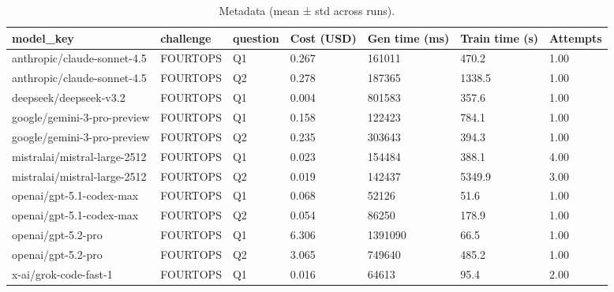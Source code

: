 \begin{table}
\caption{Metadata (mean ± std across runs).}
\label{tab:benchmark_metadata}
\begin{tabular}{lllllll}
\toprule
model\_key & challenge & question & Cost (USD) & Gen time (ms) & Train time (s) & Attempts \\
\midrule
anthropic/claude-sonnet-4.5 & FOURTOPS & Q1 & 0.267 & 161011 & 470.2 & 1.00 \\
anthropic/claude-sonnet-4.5 & FOURTOPS & Q2 & 0.278 & 187365 & 1338.5 & 1.00 \\
deepseek/deepseek-v3.2 & FOURTOPS & Q1 & 0.004 & 801583 & 357.6 & 1.00 \\
google/gemini-3-pro-preview & FOURTOPS & Q1 & 0.158 & 122423 & 784.1 & 1.00 \\
google/gemini-3-pro-preview & FOURTOPS & Q2 & 0.235 & 303643 & 394.3 & 1.00 \\
mistralai/mistral-large-2512 & FOURTOPS & Q1 & 0.023 & 154484 & 388.1 & 4.00 \\
mistralai/mistral-large-2512 & FOURTOPS & Q2 & 0.019 & 142437 & 5349.9 & 3.00 \\
openai/gpt-5.1-codex-max & FOURTOPS & Q1 & 0.068 & 52126 & 51.6 & 1.00 \\
openai/gpt-5.1-codex-max & FOURTOPS & Q2 & 0.054 & 86250 & 178.9 & 1.00 \\
openai/gpt-5.2-pro & FOURTOPS & Q1 & 6.306 & 1391090 & 66.5 & 1.00 \\
openai/gpt-5.2-pro & FOURTOPS & Q2 & 3.065 & 749640 & 485.2 & 1.00 \\
x-ai/grok-code-fast-1 & FOURTOPS & Q1 & 0.016 & 64613 & 95.4 & 2.00 \\
\bottomrule
\end{tabular}
\end{table}
